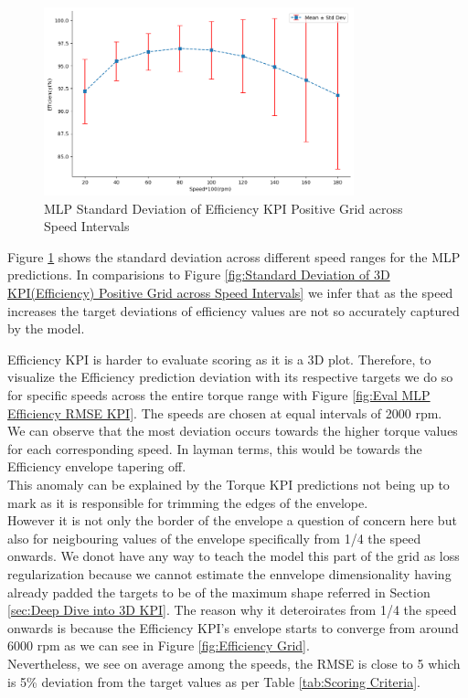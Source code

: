 \documentclass{report} %
\begin{document}
\begin{figure}[H]
    \centering
    \includegraphics[width=0.8\textwidth]{./ReportImages/stddev_y2_nn_MLP.png} 
    \caption{\ac{MLP} Standard Deviation of Efficiency \ac{KPI} Positive Grid across Speed Intervals} 
    \label{fig:MLP Standard Deviation of 3D KPI(Efficiency) Positive Grid across Speed Intervals}
\end{figure}

Figure \ref{fig:MLP Standard Deviation of 3D KPI(Efficiency) Positive Grid across Speed Intervals} shows the standard deviation across different speed ranges for the \ac{MLP} predictions.
In comparisions to Figure \ref{fig:Standard Deviation of 3D KPI(Efficiency) Positive Grid across Speed Intervals} we infer that as the speed increases the target deviations of efficiency values are not so accurately captured by the model.

Efficiency \ac{KPI} is harder to evaluate scoring as it is a 3\ac{D} plot. 
Therefore, to visualize the Efficiency prediction deviation with its respective targets we do so for specific speeds across the entire torque range with Figure \ref{fig:Eval MLP Efficiency RMSE KPI}.
The speeds are chosen at equal intervals of 2000 rpm.\\
We can observe that the most deviation occurs towards the higher torque values for each corresponding speed. In layman terms, this would be towards the Efficiency envelope tapering off.\\
This anomaly can be explained by the Torque \ac{KPI} predictions not being up to mark as it is responsible for trimming the edges of the envelope.\\
However it is not only the border of the envelope a question of concern here but also for neigbouring values of the envelope specifically from 1/4 the speed onwards. 
We donot have any way to teach the model this part of the grid as loss regularization because we cannot estimate the ennvelope dimensionality having already padded the targets to be of the maximum shape referred in Section \ref{sec:Deep Dive into 3D KPI}.
The reason why it deteroirates from 1/4 the speed onwards is because the Efficiency \ac{KPI}'s envelope starts to converge from around 6000 rpm as we can see in Figure \ref{fig:Efficiency Grid}.\\
Nevertheless, we see on average among the speeds, the \ac{RMSE} is close to 5 which is 5\% deviation from the target values as per Table \ref{tab:Scoring Criteria}.\\
\end{document}
